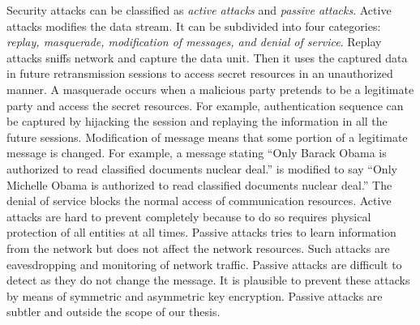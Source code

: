 	Security attacks can be classified as \textit{active attacks} and \textit{passive attacks}.
	Active attacks modifies the data stream. 
	It can be subdivided into four categories: \textit{replay, masquerade, modification of messages, and denial of service}.
	Replay attacks sniffs network and capture the data unit.
	Then it uses the captured data in future retransmission sessions to access secret resources in an unauthorized manner.
	A masquerade occurs when a malicious party pretends to be a legitimate party and access the secret resources.
	For example, authentication sequence can be captured by hijacking the session and replaying the information in all the future sessions.
	Modification of message means that some portion of a legitimate message is changed.
	For example, a message stating ``Only Barack Obama is authorized to read classified documents nuclear deal.'' is modified to say ``Only Michelle Obama is authorized to read classified documents nuclear deal.''
	The denial of service blocks the normal access of communication resources.
	Active attacks are hard to prevent completely because to do so requires physical protection of all entities at all times.
	Passive attacks tries to learn information from the network but does not affect the network resources.
	Such attacks are eavesdropping and monitoring of network traffic.
	Passive attacks are difficult to detect as they do not change the message.
	It is plausible to prevent these attacks by means of symmetric and asymmetric key encryption. 
	Passive attacks are subtler and outside the scope of our thesis.

